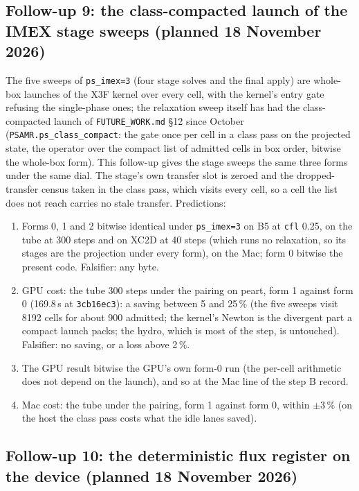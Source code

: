 \documentclass[11pt,a4paper]{article}
\newcommand{\code}[1]{\texttt{\small #1}}
\begin{document}
\subsection*{Follow-up 9: the class-compacted launch of the IMEX stage sweeps (planned 18 November 2026)}

The five sweeps of \code{ps\_imex=3} (four stage solves and the final
apply) are whole-box launches of the X3F kernel over every cell, with
the kernel's entry gate refusing the single-phase ones; the relaxation
sweep itself has had the class-compacted launch of \code{FUTURE\_WORK.md}
\S12 since October (\code{PSAMR.ps\_class\_compact}: the gate once per
cell in a class pass on the projected state, the operator over the
compact list of admitted cells in box order, bitwise the whole-box
form).  This follow-up gives the stage sweeps the same three forms
under the same dial.  The stage's own transfer slot is zeroed and the
dropped-transfer census taken in the class pass, which visits every
cell, so a cell the list does not reach carries no stale transfer.
Predictions:
\begin{enumerate}[nosep]
\item Forms 0, 1 and 2 bitwise identical under \code{ps\_imex=3} on B5
      at \code{cfl} 0.25, on the tube at 300 steps and on XC2D at 40
      steps (which runs no relaxation, so its stages are the projection
      under every form), on the Mac; form 0 bitwise the present code.
      Falsifier: any byte.
\item GPU cost: the tube 300 steps under the pairing on peart, form 1
      against form 0 (169.8\,s at \code{3cb16ec3}): a saving between 5
      and 25\,\% (the five sweeps visit 8192 cells for about 900
      admitted; the kernel's Newton is the divergent part a compact
      launch packs; the hydro, which is most of the step, is
      untouched).  Falsifier: no saving, or a loss above 2\,\%.
\item The GPU result bitwise the GPU's own form-0 run (the per-cell
      arithmetic does not depend on the launch), and so at the Mac line
      of the step B record.
\item Mac cost: the tube under the pairing, form 1 against form 0,
      within $\pm3\,\%$ (on the host the class pass costs what the idle
      lanes saved).
\end{enumerate}

\subsection*{Follow-up 10: the deterministic flux register on the device (planned 18 November 2026)}
\end{document}
